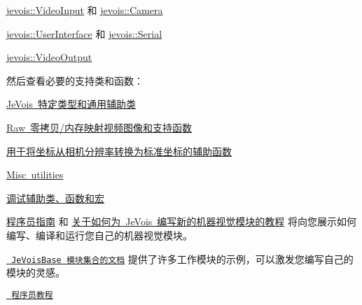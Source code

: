 \begin{DoxyItemize}
\begin{DoxyItemize}
\item \mbox{\hyperlink{classjevois_1_1VideoInput}{jevois\+::\+Video\+Input}} 和 \mbox{\hyperlink{classjevois_1_1Camera}{jevois\+::\+Camera}}
\item \mbox{\hyperlink{classjevois_1_1UserInterface}{jevois\+::\+User\+Interface}} 和 \mbox{\hyperlink{classjevois_1_1Serial}{jevois\+::\+Serial}}
\item \mbox{\hyperlink{classjevois_1_1VideoOutput}{jevois\+::\+Video\+Output}}
\end{DoxyItemize}
\item 然后查看必要的支持类和函数：
\begin{DoxyItemize}
\item \mbox{\hyperlink{group__types}{Je\+Vois 特定类型和通用辅助类}}
\item \mbox{\hyperlink{group__image}{Raw 零拷贝/内存映射视频图像和支持函数}}
\item \mbox{\hyperlink{group__coordhelpers}{用于将坐标从相机分辨率转换为标准坐标的辅助函数}}
\item \mbox{\hyperlink{group__utils}{Misc utilities}}
\item \mbox{\hyperlink{group__debugging}{调试辅助类、函数和宏}}
\end{DoxyItemize}
\item \mbox{\hyperlink{Programmer}{程序员指南}} 和 \mbox{\hyperlink{ModuleTutorial}{关于如何为 Je\+Vois 编写新的机器视觉模块的教程}} 将向您展示如何编写、编译和运行您自己的机器视觉模块。
\item \href{/basedoc/}{\texttt{ Je\+Vois\+Base 模块集合的文档}} 提供了许多工作模块的示例，可以激发您编写自己的模块的灵感。
\item \href{/tutorials}{\texttt{ 程序员教程}} 
\end{DoxyItemize}
